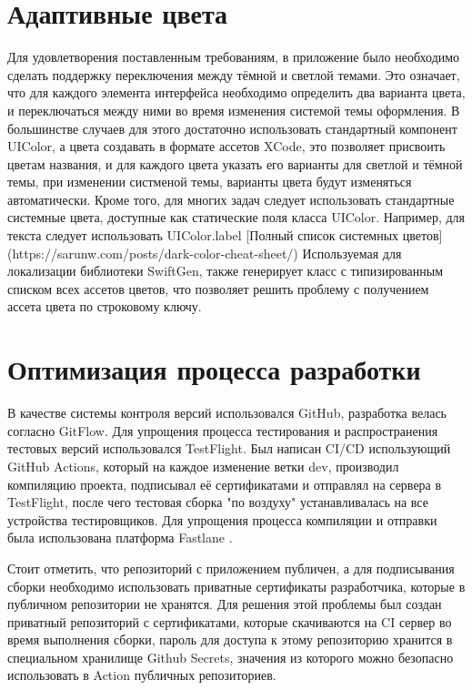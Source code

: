   \section{Адаптивные цвета}
    Для удовлетворения поставленным требованиям, в приложение было необходимо сделать поддержку переключения между тёмной и светлой темами. Это означает, что для каждого элемента интерфейса необходимо определить два варианта цвета, и переключаться между ними во время изменения системой темы оформления. В большинстве случаев для этого достаточно использовать стандартный компонент UIColor, а цвета создавать в формате ассетов XCode, это позволяет присвоить цветам названия, и для каждого цвета указать его варианты для светлой и тёмной темы, при изменении систменой темы, варианты цвета будут изменяться автоматически. Кроме того, для многих задач следует использовать стандартные системные цвета, доступные как статические поля класса UIColor. Например, для текста следует использовать UIColor.label [Полный список системных цветов](https://sarunw.com/posts/dark-color-cheat-sheet/)
    Используемая для локализации библиотеки SwiftGen, также генерирует класс с типизированным списком всех ассетов цветов, что позволяет решить проблему с получением ассета цвета по строковому ключу.

  \section{Оптимизация процесса разработки}
    В качестве системы контроля версий использовался GitHub, разработка велась согласно GitFlow. Для упрощения процесса тестирования и распространения тестовых версий использовался TestFlight. Был написан CI/CD использующий GitHub Actions, который на каждое изменение ветки dev, производил компиляцию проекта, подписывал её сертификатами и отправлял на сервера в TestFlight, после чего тестовая сборка "по воздуху" устанавливалась на все устройства тестировщиков. Для упрощения процесса компиляции и отправки была использована платформа Fastlane \cite{Fastlane}.

    Стоит отметить, что репозиторий с приложением публичен, а для подписывания сборки необходимо использовать приватные сертификаты разработчика, которые в публичном репозитории не хранятся. Для решения этой проблемы был создан приватный репозиторий с сертификатами, которые скачиваются на CI сервер во время выполнения сборки, пароль для доступа к этому репозиторию хранится в специальном хранилище Github Secrets, значения из которого можно безопасно использовать в Action публичных репозиториев.

